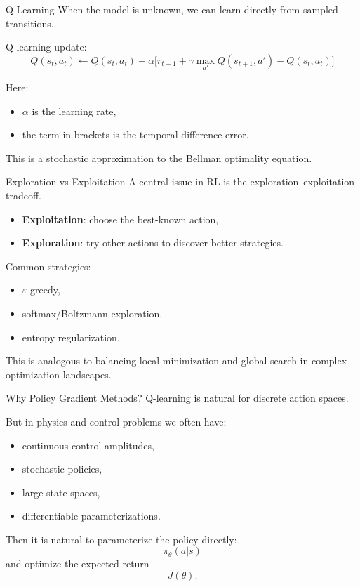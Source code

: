 \documentclass[aspectratio=169]{beamer}
\begin{document}
\begin{frame}{Q-Learning}
  When the model is unknown, we can learn directly from sampled transitions.

  Q-learning update:
  \[
  Q(s_t,a_t)\leftarrow Q(s_t,a_t) +
  \alpha\Big[r_{t+1}+\gamma \max_{a'}Q(s_{t+1},a')-Q(s_t,a_t)\Big]
  \]

  Here:
  \begin{itemize}
  \item $\alpha$ is the learning rate,
  \item the term in brackets is the temporal-difference error.
  \end{itemize}

  This is a stochastic approximation to the Bellman optimality equation.
\end{frame}

\begin{frame}{Exploration vs Exploitation}
  A central issue in RL is the exploration--exploitation tradeoff.

  \begin{itemize}
  \item \textbf{Exploitation}: choose the best-known action,
  \item \textbf{Exploration}: try other actions to discover better strategies.
  \end{itemize}

  Common strategies:
  \begin{itemize}
  \item $\varepsilon$-greedy,
  \item softmax/Boltzmann exploration,
  \item entropy regularization.
  \end{itemize}

  This is analogous to balancing local minimization and global search in complex optimization landscapes.
\end{frame}

\begin{frame}{Why Policy Gradient Methods?}
  Q-learning is natural for discrete action spaces.

  But in physics and control problems we often have:
  \begin{itemize}
  \item continuous control amplitudes,
  \item stochastic policies,
  \item large state spaces,
  \item differentiable parameterizations.
  \end{itemize}

  Then it is natural to parameterize the policy directly:
  \[
  \pi_\theta(a|s)
  \]
  and optimize the expected return
  \[
  J(\theta).
  \]
\end{frame}
\end{document}
